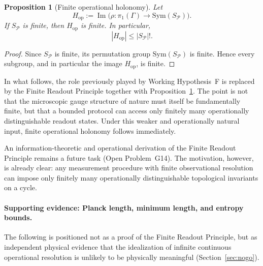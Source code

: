 \documentclass[sn-mathphys-num,Numbered]{sn-jnl}
\theoremstyle{thmstyleone}
\newtheorem{proposition}[theorem]{Proposition}
\theoremstyle{thmstylethree}
\theoremstyle{thmstyletwo}
\begin{document}
\begin{proposition}[Finite operational holonomy]
\label{prop:finite-operational-holonomy}
Let
\[
H_{\mathrm{op}} := \operatorname{Im}\!\bigl(\rho:\pi_1(\Gamma)\to \mathrm{Sym}(S_{\mathcal P})\bigr).
\]
If $S_{\mathcal P}$ is finite, then $H_{\mathrm{op}}$ is finite. In
particular,
\[
|H_{\mathrm{op}}| \le |S_{\mathcal P}|!.
\]
\end{proposition}

\begin{proof}
Since $S_{\mathcal P}$ is finite, its permutation group
$\mathrm{Sym}(S_{\mathcal P})$ is finite. Hence every subgroup, and in
particular the image $H_{\mathrm{op}}$, is finite.
\end{proof}

In what follows, the role previously played by Working Hypothesis~F is replaced by the Finite Readout Principle together with
Proposition~\ref{prop:finite-operational-holonomy}. The point is not
that the microscopic gauge structure of nature must itself be
fundamentally finite, but that a bounded protocol can access only
finitely many operationally distinguishable readout states. Under this
weaker and operationally natural input, finite operational holonomy
follows immediately.

An information-theoretic and operational derivation of the Finite
Readout Principle remains a future task (Open Problem~G14). The
motivation, however, is already clear: any measurement procedure with
finite observational resolution can impose only finitely many
operationally distinguishable topological invariants on a cycle.

\paragraph{Supporting evidence: Planck length, minimum length, and entropy bounds.}
The following is positioned not as a proof of the Finite Readout
Principle, but as independent physical evidence that the idealization of
infinite continuous operational resolution is unlikely to be physically
meaningful (Section~\ref{sec:nogo}).
\end{document}
